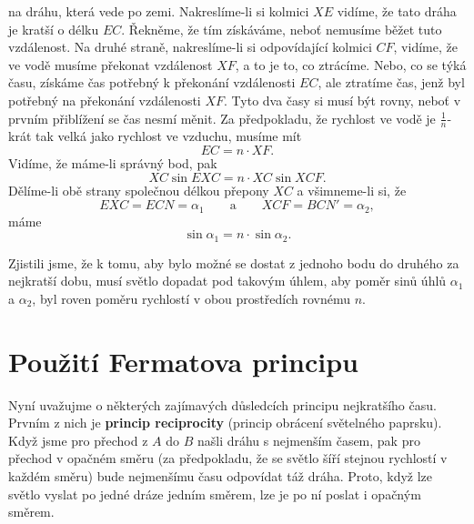     na dráhu, která vede po zemi. Nakreslíme-li si kolmici \(XE\) vidíme, že tato dráha je kratší o 
    délku \(EC\). Řekněme, že tím získáváme, neboť nemusíme běžet tuto vzdálenost. Na druhé straně, 
    nakreslíme-li si odpovídající kolmici \(CF\), vidíme, že ve vodě musíme překonat vzdálenost 
    \(XF\), a to je to, co ztrácíme. Nebo, co se týká času, získáme čas potřebný k překonání 
    vzdálenosti \(EC\), ale ztratíme čas, jenž byl potřebný na překonání vzdálenosti \(XF\). Tyto 
    dva časy si musí být rovny, neboť v prvním přiblížení se čas nesmí měnit. Za předpokladu, že 
    rychlost ve vodě je \(\frac{1}{n}\)-krát tak velká jako rychlost ve vzduchu, musíme mít
    \begin{equation}\label{fyz:eq355}
      EC = n\cdot XF.
    \end{equation}
    Vidíme, že máme-li správný bod, pak
    \begin{equation*}
      XC\sin EXC = n\cdot XC\sin XCF.
    \end{equation*}
    Dělíme-li obě strany společnou délkou přepony \(XC\) a všimneme-li si, že
    \begin{equation*}
      EXC = ECN = \alpha_1 \qquad \text{a} \qquad XCF = BCN' = \alpha_2,
    \end{equation*}
    máme
    \begin{equation}\label{fyz:eq356}
      \sin\alpha_1 = n\cdot\sin\alpha_2.
    \end{equation}
    
    Zjistili jsme, že k tomu, aby bylo možné se dostat z jednoho bodu do druhého za nejkratší dobu, 
    musí světlo dopadat pod takovým úhlem, aby poměr sinů úhlů \(\alpha_1\) a \(\alpha_2\), byl 
    roven poměru rychlostí v obou prostředích rovnému \(n\).

  \section{Použití Fermatova principu}\label{fyz:IchapXXVIsecIV}
    Nyní uvažujme o některých zajímavých důsledcích principu nejkratšího času. Prvním z nich je 
    \textbf{princip reciprocity} (princip obrácení světelného paprsku). Když jsme pro přechod z 
    \(A\) do \(B\) našli dráhu s nejmenším časem, pak pro přechod v opačném směru (za předpokladu, 
    že se světlo šíří stejnou rychlostí v každém směru) bude nejmenšímu času odpovídat táž dráha. 
    Proto, když lze světlo vyslat po jedné dráze jedním směrem, lze je po ní poslat i opačným 
    směrem.
    
